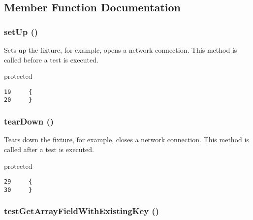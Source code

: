 \subsection{Member Function Documentation}
\hypertarget{class_coruja_array_manipulation_test_0bc688732d2b3b162ffebaf7812e78da}{
\subsubsection[{setUp}]{\setlength{\rightskip}{0pt plus 5cm}setUp ()}}
\label{class_coruja_array_manipulation_test_0bc688732d2b3b162ffebaf7812e78da}


Sets up the fixture, for example, opens a network connection. This method is called before a test is executed.

protected 

\begin{Code}\begin{verbatim}19     {
20     }
\end{verbatim}
\end{Code}


\hypertarget{class_coruja_array_manipulation_test_80fe3d17e658907fc75346a0ec9d6fc7}{
\subsubsection[{tearDown}]{\setlength{\rightskip}{0pt plus 5cm}tearDown ()}}
\label{class_coruja_array_manipulation_test_80fe3d17e658907fc75346a0ec9d6fc7}


Tears down the fixture, for example, closes a network connection. This method is called after a test is executed.

protected 

\begin{Code}\begin{verbatim}29     {
30     }
\end{verbatim}
\end{Code}


\hypertarget{class_coruja_array_manipulation_test_2b39098a7334b209f5e54877bf165e9b}{
\subsubsection[{testGetArrayFieldWithExistingKey}]{\setlength{\rightskip}{0pt plus 5cm}testGetArrayFieldWithExistingKey ()}}
\label{class_coruja_array_manipulation_test_2b39098a7334b209f5e54877bf165e9b}




